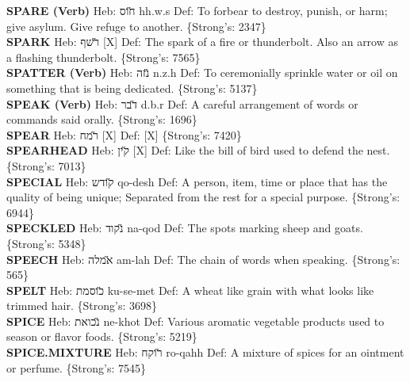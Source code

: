 {\textbf{SPARE (Verb)} Heb: {\large\H חוס} hh.w.s Def: To forbear to destroy, punish, or harm; give asylum. Give refuge to another. \{Strong's: 2347\}\hfill{}\\

\textbf{SPARK} Heb: {\large\H רשף} {[}X{]} Def: The spark of a fire or thunderbolt. Also an arrow as a flashing thunderbolt. \{Strong's: 7565\}\hfill{}\\

\textbf{SPATTER (Verb)} Heb: {\large\H נזה} n.z.h Def: To ceremonially sprinkle water or oil on something that is being dedicated. \{Strong's: 5137\}\hfill{}\\

\textbf{SPEAK (Verb)} Heb: {\large\H דבר} d.b.r Def: A careful arrangement of words or commands said orally. \{Strong's: 1696\}\hfill{}\\

\textbf{SPEAR} Heb: {\large\H רמח} {[}X{]} Def: {[}X{]} \{Strong's: 7420\}\hfill{}\\

\textbf{SPEARHEAD} Heb: {\large\H קין} {[}X{]} Def: Like the bill of bird used to defend the nest. \{Strong's: 7013\}\hfill{}\\

\textbf{SPECIAL} Heb: {\large\H קודש} qo-desh Def: A person, item, time or place that has the quality of being unique; Separated from the rest for a special purpose. \{Strong's: 6944\}\hfill{}\\

\textbf{SPECKLED} Heb: {\large\H נקוד} na-qod Def: The spots marking sheep and goats. \{Strong's: 5348\}\hfill{}\\

\textbf{SPEECH} Heb: {\large\H אמלה} am-lah Def: The chain of words when speaking. \{Strong's: 565\}\hfill{}\\

\textbf{SPELT} Heb: {\large\H כוסמת} ku-se-met Def: A wheat like grain with what looks like trimmed hair. \{Strong's: 3698\}\hfill{}\\

\textbf{SPICE} Heb: {\large\H נכואת} ne-khot Def: Various aromatic vegetable products used to season or flavor foods. \{Strong's: 5219\}\hfill{}\\

\textbf{SPICE.MIXTURE} Heb: {\large\H רוקח} ro-qahh Def: A mixture of spices for an ointment or perfume. \{Strong's: 7545\}\hfill{}\\

}
